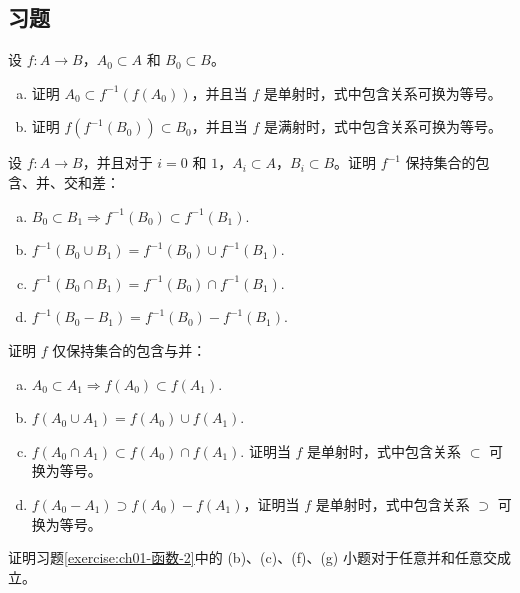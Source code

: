 \documentclass[../../main.tex]{subfiles}
\begin{document}
\subsection*{习题}

\begin{exercise}\label{exercise:ch01-函数-1}
设 $f: A \longrightarrow B$，$A_{0} \subset A$ 和 $B_{0} \subset B$。
\begin{enumerate}[(a)]
\item 证明 $A_{0} \subset f^{-1}(f(A_{0}))$，并且当 $f$ 是单射时，式中包含关系可换为等号。
\item 证明 $f(f^{-1}(B_{0})) \subset B_{0}$，并且当 $f$ 是满射时，式中包含关系可换为等号。
\end{enumerate}
\end{exercise}

\begin{exercise}\label{exercise:ch01-函数-2}
设 $f: A \longrightarrow B$，并且对于 $i = 0$ 和 $1$，$A_{i} \subset A$，$B_{i} \subset B$。证明 $f^{-1}$ 保持集合的包含、并、交和差：
\begin{enumerate}[(a)]
\item $B_{0} \subset B_{1} \Longrightarrow f^{-1}(B_{0}) \subset f^{-1}(B_{1})$.
\item $f^{-1}(B_{0} \cup B_{1}) = f^{-1}(B_{0}) \cup f^{-1}(B_{1})$.
\item $f^{-1}(B_{0} \cap B_{1}) = f^{-1}(B_{0}) \cap f^{-1}(B_{1})$.
\item $f^{-1}(B_{0} - B_{1}) = f^{-1}(B_{0}) - f^{-1}(B_{1})$.
\end{enumerate}
证明 $f$ 仅保持集合的包含与并：
\begin{enumerate}[(e)]
\item $A_{0} \subset A_{1} \Longrightarrow f(A_{0}) \subset f(A_{1})$.
\item $f(A_{0} \cup A_{1}) = f(A_{0}) \cup f(A_{1})$.
\item $f(A_{0} \cap A_{1}) \subset f(A_{0}) \cap f(A_{1})$. 证明当 $f$ 是单射时，式中包含关系 $\subset$ 可换为等号。
\item $f(A_{0} - A_{1}) \supset f(A_{0}) - f(A_{1})$，证明当 $f$ 是单射时，式中包含关系 $\supset$ 可换为等号。
\end{enumerate}
\end{exercise}

\begin{exercise}\label{exercise:ch01-函数-3}
证明习题\cref{exercise:ch01-函数-2}中的 (b)、(c)、(f)、(g) 小题对于任意并和任意交成立。
\end{exercise}
\end{document}
